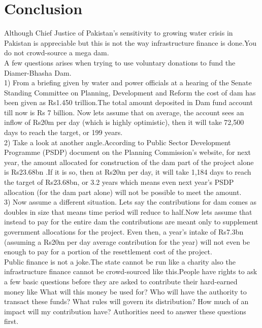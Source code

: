 \documentclass[11pt, journal,letterpaper,compsoc]{IEEEtran}
\begin{document}
\section{Conclusion}
Although Chief Justice of Pakistan's sensitivity to growing water crisis in Pakistan is appreciable but this is not the way infrastructure finance is done.You do not crowd-source a mega dam. \cite{husain2018donating}  \\
A few questions arises when trying to use voluntary donations to fund the Diamer-Bhasha Dam.\\
1) From a briefing given by water and power officials at a hearing of the Senate Standing Committee on Planning, Development and Reform the cost of dam has been given as Rs1.450 trillion.The total amount deposited in Dam fund account till now is Rs 7 billion.
Now lets assume that on average, the account sees an inflow of Rs20m per day (which is highly optimistic), then it will take 72,500 days to reach the target, or 199 years.\\
2) Take a look at another angle.According to Public Sector Development Programme (PSDP) document on the Planning Commission’s website, for next year, the amount allocated for construction of the dam part of the project alone is Rs23.68bn .If it is so,
then at Rs20m per day, it will take 1,184 days to reach the target of Rs23.68bn, or 3.2 years which means even next year’s PSDP allocation (for the dam part alone) will not be possible to meet the amount. \\
3) Now assume a different situation. Lets say the contributions for dam comes as doubles in size that means time period will reduce to half.Now lets assume that instead to pay for the entire dam the contributions are meant only to supplement government allocations for the project. Even then, a year’s intake of Rs7.3bn (assuming a Rs20m per day average contribution for the year) will not even be enough to pay for a portion of the resettlement cost of the project. \\
Public finance is not a joke.The state cannot be run like a charity also the infrastructure finance cannot be crowd-sourced like this.People have rights to ask a few basic questions before they are asked to contribute their hard-earned money like What will this money be used for? Who will have the authority to transact these funds? What rules will govern its distribution? How much of an impact will my contribution have? Authorities need to answer these questions first.
\end{document}
